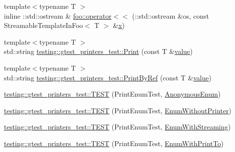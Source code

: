 \begin{DoxyCompactItemize}
\item 
{\footnotesize template$<$typename T $>$ }\\inline \+::std\+::ostream \& \mbox{\hyperlink{namespacefoo_abe04f604d114085b0b9af25600ef00da}{foo\+::operator$<$$<$}} (\+::std\+::ostream \&os, const Streamable\+Template\+In\+Foo$<$ T $>$ \&\mbox{\hyperlink{_obj__test_2lib_2googletest-master_2googlemock_2test_2gmock-matchers__test_8cc_a6150e0515f7202e2fb518f7206ed97dc}{x}})
\item 
{\footnotesize template$<$typename T $>$ }\\std\+::string \mbox{\hyperlink{namespacetesting_1_1gtest__printers__test_ab1fefdb330a473343afa3cc6d46a65f6}{testing\+::gtest\+\_\+printers\+\_\+test\+::\+Print}} (const T \&\mbox{\hyperlink{_obj__test_2lib_2googletest-master_2googlemock_2test_2gmock-matchers__test_8cc_a337b8a670efc0b086ad3af163f3121b6}{value}})
\item 
{\footnotesize template$<$typename T $>$ }\\std\+::string \mbox{\hyperlink{namespacetesting_1_1gtest__printers__test_a680e1fd7cfbae100466abe89567a0ee9}{testing\+::gtest\+\_\+printers\+\_\+test\+::\+Print\+By\+Ref}} (const T \&\mbox{\hyperlink{_obj__test_2lib_2googletest-master_2googlemock_2test_2gmock-matchers__test_8cc_a337b8a670efc0b086ad3af163f3121b6}{value}})
\item 
\mbox{\hyperlink{namespacetesting_1_1gtest__printers__test_ac79ac1529e754dddbaff5ba108ba3de3}{testing\+::gtest\+\_\+printers\+\_\+test\+::\+T\+E\+ST}} (Print\+Enum\+Test, \mbox{\hyperlink{googletest-master_2googletest_2test_2googletest-printers-test_8cc_a7a5ee9fe858568a85d80af1312aefb8b}{Anonymous\+Enum}})
\item 
\mbox{\hyperlink{namespacetesting_1_1gtest__printers__test_ae435934e9be88c7813ac6aee2ce0ce53}{testing\+::gtest\+\_\+printers\+\_\+test\+::\+T\+E\+ST}} (Print\+Enum\+Test, \mbox{\hyperlink{googletest-master_2googletest_2test_2googletest-printers-test_8cc_a404f735da62338180a19ae16f80e09c8}{Enum\+Without\+Printer}})
\item 
\mbox{\hyperlink{namespacetesting_1_1gtest__printers__test_a152cda5e11caecc372208103022726d1}{testing\+::gtest\+\_\+printers\+\_\+test\+::\+T\+E\+ST}} (Print\+Enum\+Test, \mbox{\hyperlink{googletest-master_2googletest_2test_2googletest-printers-test_8cc_a52d9f846ca7a081ba3acf88dd6cd46dc}{Enum\+With\+Streaming}})
\item 
\mbox{\hyperlink{namespacetesting_1_1gtest__printers__test_a171e23e5a52e6b7355c00daf8391ec12}{testing\+::gtest\+\_\+printers\+\_\+test\+::\+T\+E\+ST}} (Print\+Enum\+Test, \mbox{\hyperlink{googletest-master_2googletest_2test_2googletest-printers-test_8cc_a904d619d593201ed509be794aed041ec}{Enum\+With\+Print\+To}})

\end{DoxyCompactItemize}
